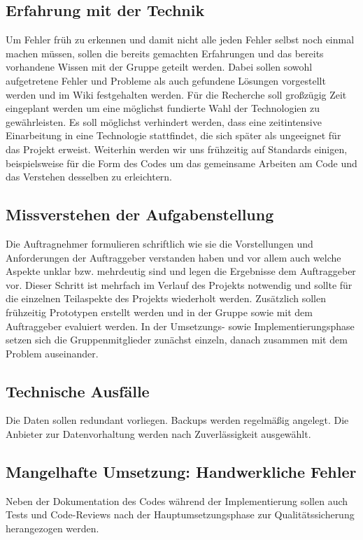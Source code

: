 \subsection{Erfahrung mit der Technik}\label{m7}
  Um Fehler früh zu erkennen und damit nicht alle jeden Fehler selbst noch einmal machen müssen, sollen die bereits gemachten Erfahrungen und das bereits vorhandene Wissen mit der Gruppe geteilt werden.
  Dabei sollen sowohl aufgetretene Fehler und Probleme als auch gefundene Lösungen vorgestellt werden und im Wiki festgehalten werden.
  Für die Recherche soll großzügig Zeit eingeplant werden um eine möglichst fundierte Wahl der Technologien zu gewährleisten. Es soll möglichst verhindert werden, dass eine zeitintensive Einarbeitung in eine Technologie stattfindet, die sich später als ungeeignet für das Projekt erweist.
  Weiterhin werden wir uns frühzeitig auf Standards einigen, beispielsweise für die Form des Codes um das gemeinsame Arbeiten am Code und das Verstehen desselben zu erleichtern.


\subsection{Missverstehen der Aufgabenstellung}\label{m8}
  Die Auftragnehmer formulieren schriftlich wie sie die Vorstellungen und Anforderungen der Auftraggeber verstanden haben und vor allem auch welche Aspekte unklar bzw. mehrdeutig sind und legen die Ergebnisse dem Auftraggeber vor.
  Dieser Schritt ist mehrfach im Verlauf des Projekts notwendig und sollte für die einzelnen Teilaspekte des Projekts wiederholt werden.
  Zusätzlich sollen frühzeitig Prototypen erstellt werden und in der Gruppe sowie mit dem Auftraggeber evaluiert werden.
  In der Umsetzungs- sowie Implementierungsphase setzen sich die Gruppenmitglieder zunächst einzeln, danach zusammen mit dem Problem auseinander.


\subsection{Technische Ausfälle}\label{m9}
  Die Daten sollen redundant vorliegen. Backups werden regelmäßig angelegt. Die Anbieter zur Datenvorhaltung werden nach Zuverlässigkeit ausgewählt.

\subsection{Mangelhafte Umsetzung: {\glqq}Handwerkliche Fehler{\grqq}}\label{m10}
  Neben der Dokumentation des Codes während der Implementierung sollen auch Tests und Code-Reviews nach der Hauptumsetzungsphase zur Qualitätssicherung herangezogen werden.

